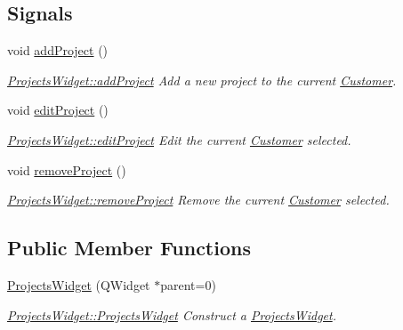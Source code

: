 \subsection*{Signals}
\begin{DoxyCompactItemize}
\item 
\hypertarget{classProjectsWidget_ae745e92738053b6c3a514725fec9616f}{void \hyperlink{classProjectsWidget_ae745e92738053b6c3a514725fec9616f}{add\+Project} ()}\label{classProjectsWidget_ae745e92738053b6c3a514725fec9616f}

\begin{DoxyCompactList}\small\item\em \hyperlink{classProjectsWidget_ae745e92738053b6c3a514725fec9616f}{Projects\+Widget\+::add\+Project} Add a new project to the current \hyperlink{classCustomer}{Customer}. \end{DoxyCompactList}\item 
\hypertarget{classProjectsWidget_a7be5b1aebb295169b201ceb4a7e3301a}{void \hyperlink{classProjectsWidget_a7be5b1aebb295169b201ceb4a7e3301a}{edit\+Project} ()}\label{classProjectsWidget_a7be5b1aebb295169b201ceb4a7e3301a}

\begin{DoxyCompactList}\small\item\em \hyperlink{classProjectsWidget_a7be5b1aebb295169b201ceb4a7e3301a}{Projects\+Widget\+::edit\+Project} Edit the current \hyperlink{classCustomer}{Customer} selected. \end{DoxyCompactList}\item 
\hypertarget{classProjectsWidget_a1ee6b31af551020de2aa560f18be0ccc}{void \hyperlink{classProjectsWidget_a1ee6b31af551020de2aa560f18be0ccc}{remove\+Project} ()}\label{classProjectsWidget_a1ee6b31af551020de2aa560f18be0ccc}

\begin{DoxyCompactList}\small\item\em \hyperlink{classProjectsWidget_a1ee6b31af551020de2aa560f18be0ccc}{Projects\+Widget\+::remove\+Project} Remove the current \hyperlink{classCustomer}{Customer} selected. \end{DoxyCompactList}\end{DoxyCompactItemize}
\subsection*{Public Member Functions}
\begin{DoxyCompactItemize}
\item 
\hyperlink{classProjectsWidget_a542fb678c61897b56c86dc58524bd969}{Projects\+Widget} (Q\+Widget $\ast$parent=0)
\begin{DoxyCompactList}\small\item\em \hyperlink{classProjectsWidget_a542fb678c61897b56c86dc58524bd969}{Projects\+Widget\+::\+Projects\+Widget} Construct a \hyperlink{classProjectsWidget}{Projects\+Widget}. \end{DoxyCompactList}\end{DoxyCompactItemize}


